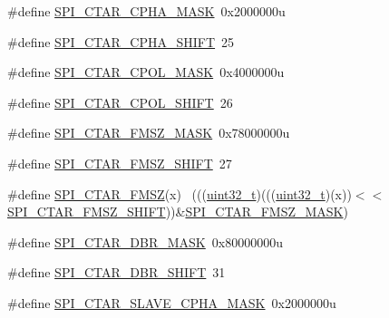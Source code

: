 \begin{DoxyCompactItemize}
\item 
\#define \hyperlink{group___s_p_i___register___masks_ga562416b33f74ea5595e122d862093e51}{S\+P\+I\+\_\+\+C\+T\+A\+R\+\_\+\+C\+P\+H\+A\+\_\+\+M\+A\+SK}~0x2000000u
\item 
\#define \hyperlink{group___s_p_i___register___masks_ga1a27d47d54bd5b51d69b21216b3662b4}{S\+P\+I\+\_\+\+C\+T\+A\+R\+\_\+\+C\+P\+H\+A\+\_\+\+S\+H\+I\+FT}~25
\item 
\#define \hyperlink{group___s_p_i___register___masks_ga128560de0ef72566ec53bb208e6ad5ef}{S\+P\+I\+\_\+\+C\+T\+A\+R\+\_\+\+C\+P\+O\+L\+\_\+\+M\+A\+SK}~0x4000000u
\item 
\#define \hyperlink{group___s_p_i___register___masks_gac46d6c45f2f45383d1f6d062a570e81d}{S\+P\+I\+\_\+\+C\+T\+A\+R\+\_\+\+C\+P\+O\+L\+\_\+\+S\+H\+I\+FT}~26
\item 
\#define \hyperlink{group___s_p_i___register___masks_ga71b046a902929cf107f46e422092ff33}{S\+P\+I\+\_\+\+C\+T\+A\+R\+\_\+\+F\+M\+S\+Z\+\_\+\+M\+A\+SK}~0x78000000u
\item 
\#define \hyperlink{group___s_p_i___register___masks_gaabebaa480c90d32ad8bc580ea2507b8e}{S\+P\+I\+\_\+\+C\+T\+A\+R\+\_\+\+F\+M\+S\+Z\+\_\+\+S\+H\+I\+FT}~27
\item 
\#define \hyperlink{group___s_p_i___register___masks_gac2c43b9a91cd1755fb12864271b570f7}{S\+P\+I\+\_\+\+C\+T\+A\+R\+\_\+\+F\+M\+SZ}(x)                                              ~(((\hyperlink{_p_e___types_8h_a33594304e786b158f3fb30289278f5af}{uint32\+\_\+t})(((\hyperlink{_p_e___types_8h_a33594304e786b158f3fb30289278f5af}{uint32\+\_\+t})(x))$<$$<$\hyperlink{group___s_p_i___register___masks_gaabebaa480c90d32ad8bc580ea2507b8e}{S\+P\+I\+\_\+\+C\+T\+A\+R\+\_\+\+F\+M\+S\+Z\+\_\+\+S\+H\+I\+FT}))\&\hyperlink{group___s_p_i___register___masks_ga71b046a902929cf107f46e422092ff33}{S\+P\+I\+\_\+\+C\+T\+A\+R\+\_\+\+F\+M\+S\+Z\+\_\+\+M\+A\+SK})
\item 
\#define \hyperlink{group___s_p_i___register___masks_ga3347aad10c0b5dc1a5062275e89353b2}{S\+P\+I\+\_\+\+C\+T\+A\+R\+\_\+\+D\+B\+R\+\_\+\+M\+A\+SK}~0x80000000u
\item 
\#define \hyperlink{group___s_p_i___register___masks_ga4600954a3cc5c07f14c1b0e602cec4cd}{S\+P\+I\+\_\+\+C\+T\+A\+R\+\_\+\+D\+B\+R\+\_\+\+S\+H\+I\+FT}~31
\item 
\#define \hyperlink{group___s_p_i___register___masks_ga3e8aa9f143abc35fcb9f86e5de378621}{S\+P\+I\+\_\+\+C\+T\+A\+R\+\_\+\+S\+L\+A\+V\+E\+\_\+\+C\+P\+H\+A\+\_\+\+M\+A\+SK}~0x2000000u
\item 
$$
\end{DoxyCompactItemize}
